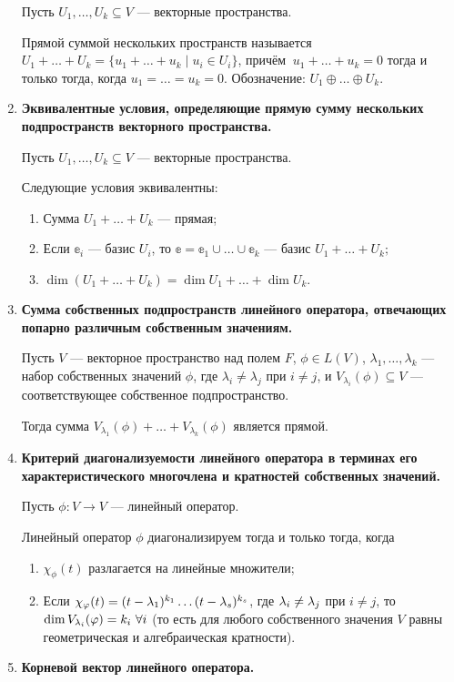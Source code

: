 \begin{enumerate}
Пусть $U_1, \ldots, U_k \subseteq V$ --- векторные пространства.

Прямой суммой нескольких пространств называется  $U_1 + \ldots + U_k = \{u_1 + \ldots + u_k \; | \; u_i \in U_i \}$, причём $\:u_1 + \ldots + u_k = 0$ тогда и только тогда, когда $u_1 = \ldots = u_k = 0$. Обозначение: $U_1 \oplus \ldots \oplus U_k$.
\item \textbf{Эквивалентные условия, определяющие прямую сумму нескольких подпространств векторного пространства.}

Пусть $U_1, \ldots, U_k \subseteq V$ --- векторные пространства.

Следующие условия эквивалентны:
	\begin{enumerate}
		\item Сумма $U_1 + \ldots + U_k$ --- прямая;
		\item Если $\mathbb{e}_i$ --- базис $U_i$, то $\mathbb{e} = \mathbb{e}_1 \cup \ldots \cup \mathbb{e}_k$ --- базис $U_1 + \ldots + U_k;$
		\item $\dim(U_1 + \ldots + U_k) = \dim{U_1} + \ldots + \dim{U_k}.$
	\end{enumerate}
\item \textbf{Сумма собственных подпространств линейного оператора, отвечающих попарно различным собственным значениям.}

Пусть $V$ --- векторное пространство над полем $F$, $\phi \in L(V)$, $\lambda_1, \ldots, \lambda_k$ --- набор собственных значений $\phi$, где $\lambda_i \neq \lambda_j$ при $i \neq j$, и $V_{\lambda_i}(\phi) \subseteq V$ --- соответствующее собственное подпространство.

Тогда сумма $V_{\lambda_1}(\phi) + \ldots + V_{\lambda_k}(\phi)$ является прямой.
\item \textbf{Критерий диагонализуемости линейного оператора в терминах его характеристического многочлена и кратностей собственных значений.}

Пусть $\phi\colon V \rightarrow V$ --- линейный оператор.

Линейный оператор $\phi$ диагонализируем тогда и только тогда, когда 
\begin{enumerate}
\item $\chi_\phi(t)$ разлагается на линейные множители;
\item Если $\chi_\varphi(t) = (t - \lambda_1)^{k_1}\dots(t - \lambda_s)^{k_s}$, где $\lambda_i \neq \lambda_j$ при $i \neq j$, то $\dim V_{\lambda_i}(\varphi) = k_i \ \forall i$ (то есть для любого собственного значения $V$ равны геометрическая и алгебраическая кратности).
\end{enumerate}
\item \textbf{Корневой вектор линейного оператора.}


\end{enumerate}
